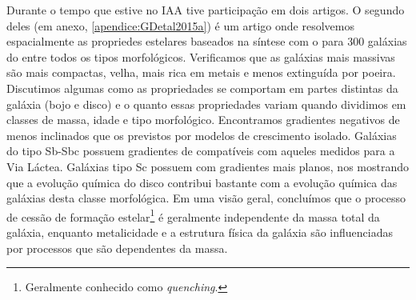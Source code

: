 Durante o tempo que estive no IAA tive participação em dois artigos. O segundo deles \citep[][GD15
daqui em diante]{GonzalezDelgado.etal.2015a} (em anexo, \ref{apendice:GDetal2015a}) é um artigo
onde resolvemos espacialmente as propriedes estelares baseados na síntese com o \starlight para 300
galáxias do \CAL entre todos os tipos morfológicos. Verificamos que as galáxias mais massivas são
mais compactas, velha, mais rica em metais e menos extinguída por poeira. Discutimos algumas como as
propriedades se comportam em partes distintas da galáxia (bojo e disco) e o quanto essas
propriedades variam quando dividimos em classes de massa, idade e tipo morfológico. Encontramos
gradientes negativos de  menos inclinados que os previstos por modelos de
crescimento isolado. Galáxias do tipo Sb-Sbc possuem gradientes de  compatíveis
com aqueles medidos para a Via Láctea. Galáxias tipo Sc possuem com gradientes mais planos, nos
mostrando que a evolução química do disco contribui bastante com a evolução química das galáxias
desta classe morfológica. Em uma visão geral, concluímos que o processo de cessão de formação
estelar\footnote{Geralmente conhecido como {\em quenching}.} é geralmente independente da massa
total da galáxia, enquanto metalicidade e a estrutura física da galáxia são influenciadas por
processos que são dependentes da massa.




